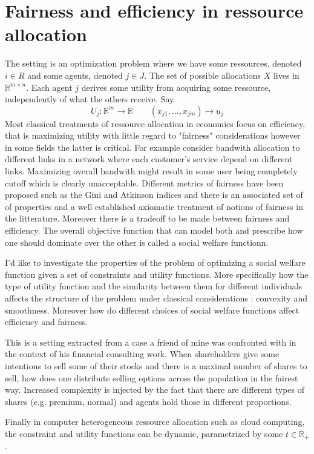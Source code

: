 

\section*{Fairness and efficiency in ressource allocation}
The setting is an optimization problem where we have some
ressources, denoted $i\in R$ and some agents, denoted $j\in J$.
The set of possible allocations $X$ lives in $\mathbb R^{m\times n}$.
Each agent $j$ derives some utility from acquiring some ressource, 
independently of what the others receive.
Say \begin{equation} U_j: \mathbb R^{m} \longrightarrow \mathbb R
\qquad (x_{j1},\ldots,x_{jm})\mapsto u_j\end{equation}
Most classical treatments of ressource allocation in economics focus on
efficiency, that is maximizing utility with little regard to "fairness"
considerations however in some fields the latter is critical.  For example
consider bandwith allocation to different links in a network where each
customer's service depend on different links. Maximizing overall bandwith
might result in some user being completely cutoff which is clearly
unacceptable. Different metrics of fairness have been proposed such as the
Gini and Atkinson indices and there is an associated set of
of properties and a well established axiomatic treatment of notions
of fairness in the litterature.
Moreover there is a tradeoff to be made between fairness and efficiency.
The overall objective function that can model both and prescribe
how one should dominate over the other is called a social welfare functionn.

I'd like to investigate the properties of the problem of optimizing a social
welfare function given a set of constraints and utility functions. More
specifically how the type of utility function and the similarity between them
for different individuals affects the structure of the problem under
classical considerations : convexity and smoothness. Moreover how 
do different choices of social welfare functions affect efficiency and 
fairness.

This is a setting extracted from a case a friend of mine was confronted with 
in the context of his financial consulting work.
When shareholders give some intentions to sell some of their stocks and
there is a maximal number of shares to sell, how does one distribute selling
options across the population in the fairest way. Increased complexity
is injected by the fact that there are different types of shares (e.g.
premium, normal) and agents hold those in different proportions.

Finally in computer heterogeneous  ressource allocation such as cloud computing,
the constraint and utility functions can be dynamic, parametrized by some 
$t\in \mathbb R_+$.

